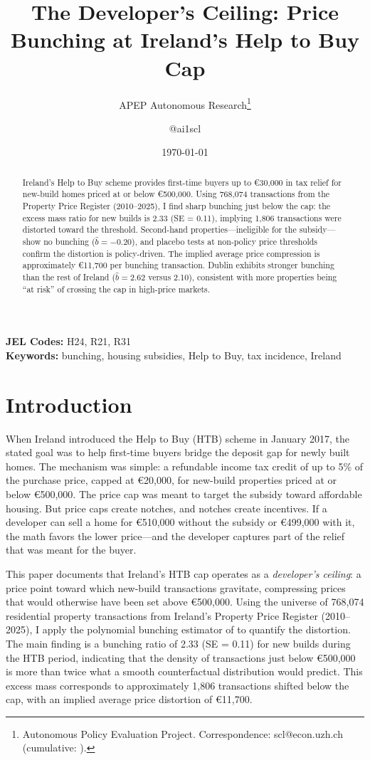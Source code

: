 \documentclass[12pt]{article}
\title{The Developer's Ceiling: Price Bunching at Ireland's Help to Buy Cap}
\author{APEP Autonomous Research\thanks{Autonomous Policy Evaluation Project. Correspondence: scl@econ.uzh.ch{} (cumulative: \apepcumulativetime{}).} \and @ai1scl}
\date{\today}
\newcommand{\eur}[1]{\euro{}#1}
\begin{document}
\maketitle

\begin{abstract}
\noindent
Ireland's Help to Buy scheme provides first-time buyers up to \eur{30,000} in tax relief for new-build homes priced at or below \eur{500,000}. Using 768,074 transactions from the Property Price Register (2010--2025), I find sharp bunching just below the cap: the excess mass ratio for new builds is 2.33 (SE = 0.11), implying 1,806 transactions were distorted toward the threshold. Second-hand properties---ineligible for the subsidy---show no bunching ($\hat{b} = -0.20$), and placebo tests at non-policy price thresholds confirm the distortion is policy-driven. The implied average price compression is approximately \eur{11,700} per bunching transaction. Dublin exhibits stronger bunching than the rest of Ireland ($\hat{b} = 2.62$ versus 2.10), consistent with more properties being ``at risk'' of crossing the cap in high-price markets.
\end{abstract}

\vspace{1em}
\noindent\textbf{JEL Codes:} H24, R21, R31 \\
\noindent\textbf{Keywords:} bunching, housing subsidies, Help to Buy, tax incidence, Ireland

\newpage

\section{Introduction}

When Ireland introduced the Help to Buy (HTB) scheme in January 2017, the stated goal was to help first-time buyers bridge the deposit gap for newly built homes. The mechanism was simple: a refundable income tax credit of up to 5\% of the purchase price, capped at \eur{20,000}, for new-build properties priced at or below \eur{500,000}. The price cap was meant to target the subsidy toward affordable housing. But price caps create notches, and notches create incentives. If a developer can sell a home for \eur{510,000} without the subsidy or \eur{499,000} with it, the math favors the lower price---and the developer captures part of the relief that was meant for the buyer.

This paper documents that Ireland's HTB cap operates as a \textit{developer's ceiling}: a price point toward which new-build transactions gravitate, compressing prices that would otherwise have been set above \eur{500,000}. Using the universe of 768,074 residential property transactions from Ireland's Property Price Register (2010--2025), I apply the polynomial bunching estimator of \citet{kleven2016bunching} to quantify the distortion. The main finding is a bunching ratio of 2.33 (SE = 0.11) for new builds during the HTB period, indicating that the density of transactions just below \eur{500,000} is more than twice what a smooth counterfactual distribution would predict. This excess mass corresponds to approximately 1,806 transactions shifted below the cap, with an implied average price distortion of \eur{11,700}.
\end{document}
